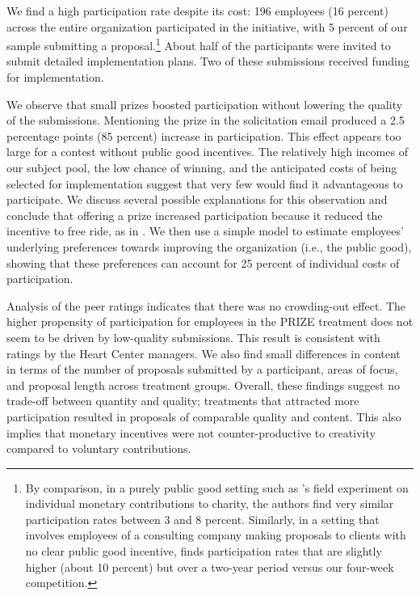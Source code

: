 \documentclass[12pt, titlepage]{article}
\begin{document}
We find a high participation rate despite its cost: 196 employees (16
percent) across the entire organization participated in the initiative,
with 5 percent of our sample submitting a proposal.\footnote{By
  comparison, in a purely public good setting such as
  \citet{list2002effects}'s field experiment on individual monetary
  contributions to charity, the authors find very similar participation
  rates between 3 and 8 percent. Similarly, in a setting that involves
  employees of a consulting company making proposals to clients with no
  clear public good incentive, \citet{gibbs2014field} finds
  participation rates that are slightly higher (about 10 percent) but
  over a two-year period versus our four-week competition.} About half
of the participants were invited to submit detailed implementation
plans. Two of these submissions received funding for implementation.

We observe that small prizes boosted participation without lowering the
quality of the submissions. Mentioning the prize in the solicitation
email produced a 2.5 percentage points (85 percent) increase in
participation. This effect appears too large for a contest without
public good incentives. The relatively high incomes of our subject pool,
the low chance of winning, and the anticipated costs of being selected
for implementation suggest that very few would find it advantageous to
participate. We discuss several possible explanations for this
observation and conclude that offering a prize increased participation
because it reduced the incentive to free ride, as in
\citet{morgan2000financing}. We then use a simple model to estimate
employees' underlying preferences towards improving the organization
(i.e., the public good), showing that these preferences can account for
25 percent of individual costs of participation.

Analysis of the peer ratings indicates that there was no crowding-out
effect. The higher propensity of participation for employees in the
PRIZE treatment does not seem to be driven by low-quality submissions.
This result is consistent with ratings by the Heart Center managers. We
also find small differences in content in terms of the number of
proposals submitted by a participant, areas of focus, and proposal
length across treatment groups. Overall, these findings suggest no
trade-off between quantity and quality; treatments that attracted more
participation resulted in proposals of comparable quality and content.
This also implies that monetary incentives were not counter-productive
to creativity compared to voluntary contributions.
\end{document}
